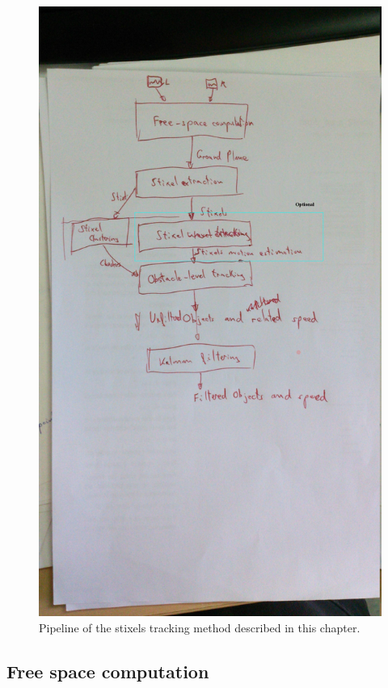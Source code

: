 \begin{figure}[h!]
  \centering
  \includegraphics{pipeline.jpg}
  \caption{Pipeline of the stixels tracking method described in this chapter.}\label{fig:cp04_pipeline}
\end{figure}

\subsection{Free space computation}\label{ch:chapter04_01_01}

